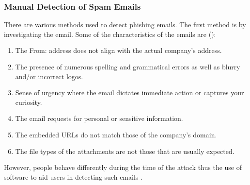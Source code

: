 \subsubsection{Manual Detection of Spam Emails}
There are various methods used to detect phishing emails. The first method is by investigating the email. Some of the characteristics of the emails are (\cite{cisco_2019}):
\begin{enumerate}[label=\roman*]
    \item The From: address does not align with the actual company's address.
    \item The presence of numerous spelling and grammatical errors as well as blurry and/or incorrect logos.
    \item Sense of urgency where the email dictates immediate action or captures your curiosity.
    \item The email requests for personal or sensitive information.
    \item The embedded URLs do not match those of the company's domain.
    \item The file types of the attachments are not those that are usually expected.
\end{enumerate}

However, people behave differently during the time of the attack thus the use of software to aid users in detecting such emails \cite{boag_2020}.